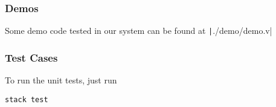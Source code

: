 \subsubsection{Demos}
Some demo code tested in our system can be found at \texttt|./demo/demo.v|

\subsubsection{Test Cases}
To run the unit tests, just run
\begin{center}
\begin{minipage}{0.7\textwidth}
\begin{verbatim}
stack test
\end{verbatim}
\end{minipage}
\end{center}


